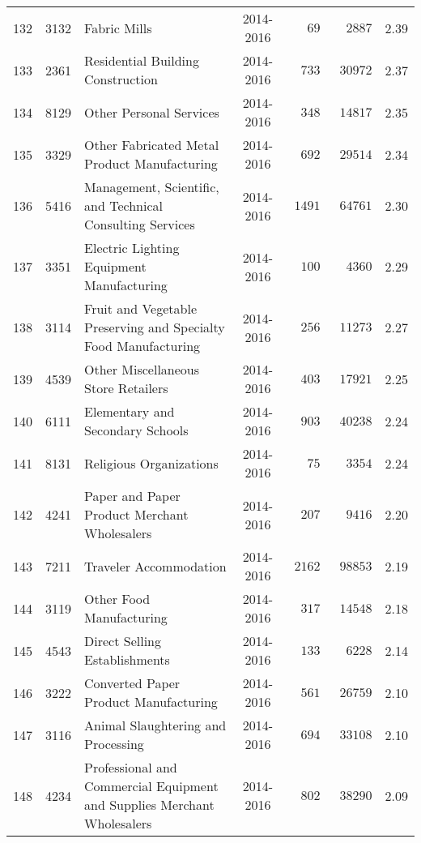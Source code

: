 \documentclass[9pt, oneside]{article}   	%
\begin{document}
\begin{longtable}{lcp{3in}cccc}
132  & 3132 & Fabric Mills & 2014-2016 & $\phantom{000}69$ & $\phantom{00}2887$ &  2.39 \\
133  & 2361 & Residential Building Construction & 2014-2016 & $\phantom{00}733$ & $\phantom{0}30972$ &  2.37 \\
134  & 8129 & Other Personal Services & 2014-2016 & $\phantom{00}348$ & $\phantom{0}14817$ &  2.35 \\
135  & 3329 & Other Fabricated Metal Product Manufacturing & 2014-2016 & $\phantom{00}692$ & $\phantom{0}29514$ &  2.34 \\
136  & 5416 & Management, Scientific, and Technical Consulting Services & 2014-2016 & $\phantom{0}1491$ & $\phantom{0}64761$ &  2.30 \\
137  & 3351 & Electric Lighting Equipment Manufacturing & 2014-2016 & $\phantom{00}100$ & $\phantom{00}4360$ &  2.29 \\
138  & 3114 & Fruit and Vegetable Preserving and Specialty Food Manufacturing & 2014-2016 & $\phantom{00}256$ & $\phantom{0}11273$ &  2.27 \\
139  & 4539 & Other Miscellaneous Store Retailers & 2014-2016 & $\phantom{00}403$ & $\phantom{0}17921$ &  2.25 \\
140  & 6111 & Elementary and Secondary Schools & 2014-2016 & $\phantom{00}903$ & $\phantom{0}40238$ &  2.24 \\
141  & 8131 & Religious Organizations & 2014-2016 & $\phantom{000}75$ & $\phantom{00}3354$ &  2.24 \\
142  & 4241 & Paper and Paper Product Merchant Wholesalers & 2014-2016 & $\phantom{00}207$ & $\phantom{00}9416$ &  2.20 \\
143  & 7211 & Traveler Accommodation & 2014-2016 & $\phantom{0}2162$ & $\phantom{0}98853$ &  2.19 \\
144  & 3119 & Other Food Manufacturing & 2014-2016 & $\phantom{00}317$ & $\phantom{0}14548$ &  2.18 \\
145  & 4543 & Direct Selling Establishments & 2014-2016 & $\phantom{00}133$ & $\phantom{00}6228$ &  2.14 \\
146  & 3222 & Converted Paper Product Manufacturing & 2014-2016 & $\phantom{00}561$ & $\phantom{0}26759$ &  2.10 \\
147  & 3116 & Animal Slaughtering and Processing & 2014-2016 & $\phantom{00}694$ & $\phantom{0}33108$ &  2.10 \\
148  & 4234 & Professional and Commercial Equipment and Supplies Merchant Wholesalers & 2014-2016 & $\phantom{00}802$ & $\phantom{0}38290$ &  2.09 \\

\end{longtable}
\end{document}
